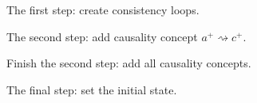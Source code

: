 \documentclass[british, journal]{IEEEtran}
\begin{document}
\begin{figure}[H]
	\begin{centering}
		\par
				\protect\caption{\label{fig:step-by-step1}The first step: create consistency loops.}
	\end{centering}
\end{figure}

\begin{figure}[H]
	\begin{centering}
		\par
				\protect\caption{\label{fig:step-by-step2}The second step: add causality concept $a^{+}\rightsquigarrow c^{+}$.}
	\end{centering}
\end{figure}

\begin{figure}[H]
	\begin{centering}
		\par
				\protect\caption{\label{fig:step-by-step9}Finish the second step: add all causality concepts.}
		\par\end{centering}
\end{figure}

\begin{figure}[H]
	\begin{centering}
		\par
				\protect\caption{\label{fig:step-by-step12}The final step: set the initial state.}
		\par\end{centering}
\end{figure}
\end{document}
